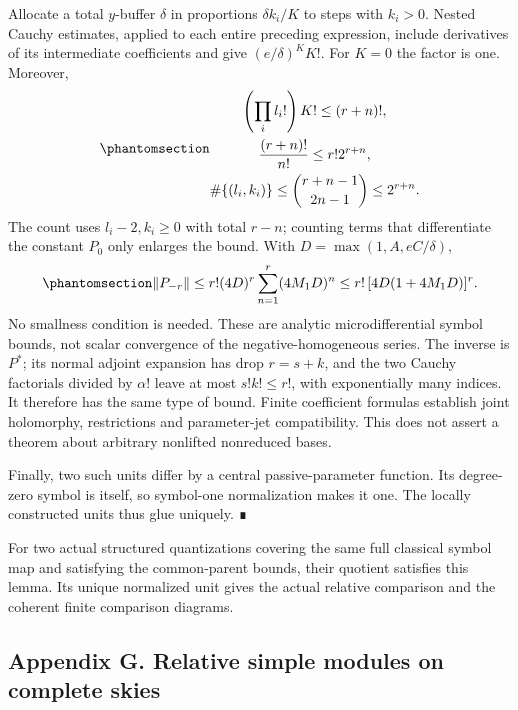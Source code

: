 \documentclass[
  english,
  11pt,
  reqno]{amsart}
\begin{document}
Allocate a total \(y\)-buffer \(\delta\) in proportions \(\delta k_i/K\)
to steps with \(k_i>0\). Nested Cauchy estimates, applied to each entire
preceding expression, include derivatives of its intermediate
coefficients and give \((e/\delta)^K K!\). For \(K=0\) the factor is
one. Moreover,
\begin{equation}\protect\phantomsection\label{eq:gg-op-relative-inner-factorial-budget}{\begin{gathered}
\left(\prod_i l_i!\right)K!\le(r+n)!, \\
\frac{(r+n)!}{n!}\le r!2^{r+n}, \\
\#\{(l_i,k_i)\}\le
       \binom{r+n-1}{2n-1}\le2^{r+n}.
\end{gathered}}\end{equation} The count uses \(l_i-2,k_i\ge0\) with total \(r-n\);
counting terms that differentiate the constant \(P_0\) only enlarges the
bound. With \(D=\max(1,A,eC/\delta)\),
\begin{equation}\protect\phantomsection\label{eq:gg-op-relative-inner-final-bound}{
 \|P_{-r}\|
 \le r!(4D)^r\sum_{n=1}^r(4M_1D)^n
 \le r!\,[4D(1+4M_1D)]^r.
}\end{equation} No smallness condition is needed. These are analytic
microdifferential symbol bounds, not scalar convergence of the
negative-homogeneous series. The inverse is \(P^*\); its normal adjoint
expansion has drop \(r=s+k\), and the two Cauchy factorials divided by
\(\alpha!\) leave at most \(s!k!\le r!\), with exponentially many
indices. It therefore has the same type of bound. Finite coefficient
formulas establish joint holomorphy, restrictions and parameter-jet
compatibility. This does not assert a theorem about arbitrary nonlifted
nonreduced bases.

Finally, two such units differ by a central passive-parameter function.
Its degree-zero symbol is itself, so symbol-one normalization makes it
one. The locally constructed units thus glue uniquely. ∎

For two actual structured quantizations covering the same full classical
symbol map and satisfying the common-parent bounds, their quotient
satisfies this lemma. Its unique normalized unit gives the actual
relative comparison and the coherent finite comparison diagrams.

\protect{}\label{app:gg-relative-sky-modules}

\subsection{Appendix G. Relative simple modules on complete
skies}\label{appendix-g.-relative-simple-modules-on-complete-skies}
\end{document}
